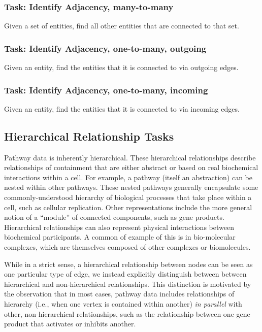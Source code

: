 \documentclass{egpubl}
\begin{document}
\subsubsection{Task: Identify Adjacency, many-to-many}
Given a set of entities, find all other entities that are connected to that set.

\subsubsection{Task: Identify Adjacency, one-to-many, outgoing}
Given an entity, find the entities that it is connected to via outgoing edges.

\subsubsection{Task: Identify Adjacency, one-to-many, incoming}
Given an entity, find the entities that it is connected to via incoming edges.

\subsection{Hierarchical Relationship Tasks}

Pathway data is inherently hierarchical.
These hierarchical relationships describe relationships of containment that are either abstract or based on real biochemical interactions within a cell.
For example, a pathway (itself an abstraction) can be nested within other pathways.
These nested pathways generally encapsulate some commonly-understood hierarchy of biological processes that take place within a cell, such as cellular replication.
Other representations include the more general notion of a ``module'' of connected components, such as gene products.
Hierarchical relationships can also represent physical interactions between biochemical participants.
A common of example of this is in bio-molecular complexes, which are themselves composed of other complexes or biomolecules.

While in a strict sense, a hierarchical relationship between nodes can be seen as one particular type of edge, we instead explicitly distinguish between between hierarchical and non-hierarchical relationships.
This distinction is motivated by the observation that in most cases, pathway data includes relationships of hierarchy (i.e., when one vertex is contained within another) \textit{in parallel} with other, non-hierarchical relationships, such as the relationship between one gene product that activates or inhibits another.
\end{document}

